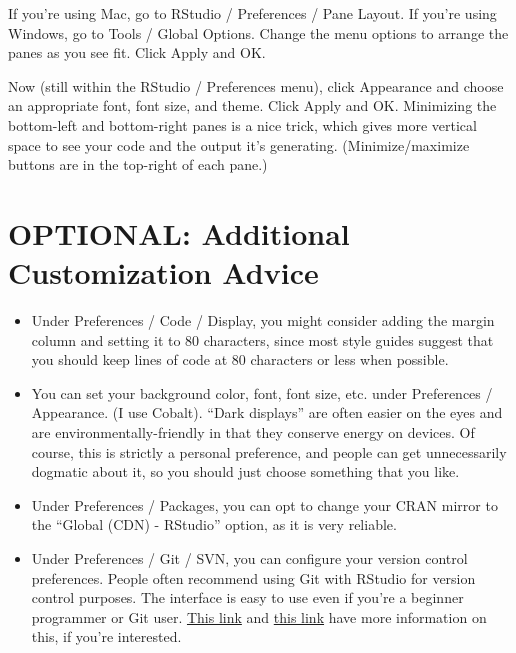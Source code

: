 \documentclass[
]{article}
\providecommand{\tightlist}{%
  \setlength{\itemsep}{0pt}\setlength{\parskip}{0pt}}
\begin{document}
If you're using Mac, go to RStudio / Preferences / Pane Layout. If
you're using Windows, go to Tools / Global Options. Change the menu
options to arrange the panes as you see fit. Click Apply and OK.

Now (still within the RStudio / Preferences menu), click Appearance and
choose an appropriate font, font size, and theme. Click Apply and OK.
Minimizing the bottom-left and bottom-right panes is a nice trick, which
gives more vertical space to see your code and the output it's
generating. (Minimize/maximize buttons are in the top-right of each
pane.)

\hypertarget{optional-additional-customization-advice}{%
\section{OPTIONAL: Additional Customization
Advice}\label{optional-additional-customization-advice}}

\begin{itemize}
\tightlist
\item
  Under Preferences / Code / Display, you might consider adding the
  margin column and setting it to 80 characters, since most style guides
  suggest that you should keep lines of code at 80 characters or less
  when possible.
\item
  You can set your background color, font, font size, etc. under
  Preferences / Appearance. (I use Cobalt). ``Dark displays'' are often
  easier on the eyes and are environmentally-friendly in that they
  conserve energy on devices. Of course, this is strictly a personal
  preference, and people can get unnecessarily dogmatic about it, so you
  should just choose something that you like.
\item
  Under Preferences / Packages, you can opt to change your CRAN mirror
  to the ``Global (CDN) - RStudio'' option, as it is very reliable.
\item
  Under Preferences / Git / SVN, you can configure your version control
  preferences. People often recommend using Git with RStudio for version
  control purposes. The interface is easy to use even if you're a
  beginner programmer or Git user.
  \href{https://support.rstudio.com/hc/en-us/articles/200532077-Version-Control-with-Git-and-SVN}{This
  link} and
  \href{https://jennybc.github.io/2014-05-12-ubc/ubc-r/session03_git.html}{this
  link} have more information on this, if you're interested.
\end{itemize}
\end{document}
